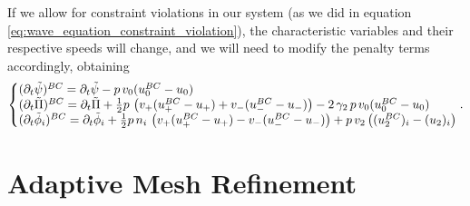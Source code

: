 If we allow for constraint violations in our system (as we did in equation \eqref{eq:wave_equation_constraint_violation}), the characteristic variables and their respective speeds will change, and we will need to modify the penalty terms accordingly, obtaining
%
\begin{align}
    \left\{\begin{array}{@{}l@{}} 
        (\partial_t\tilde{\psi})^{BC} = \partial_t\tilde{\psi} - p \, v_0 (u_0^{BC}  - u_0)\\
        (\partial_t\tilde{\Pi})^{BC} = \partial_t\tilde{\Pi} + \frac{1}{2} p \, \left( v_+(u_+^{BC}  - u_+) + v_- (u_-^{BC}  - u_-) \right) - 2 \, \gamma_2 \, p \, v_0 (u_0^{BC}  - u_0)\\
        (\partial_t\tilde{\phi}_i)^{BC} = \partial_t\tilde{\phi}_i + \frac{1}{2} p \, n_i \, \left( v_+(u_+^{BC}  - u_+) - v_- (u_-^{BC}  - u_-) \right)  + p \, v_2 \left((u_2^{BC})_i  - (u_2)_i \right) \\
    \end{array}\right. .
\end{align}

\section{Adaptive Mesh Refinement}
\label{section:amr}

